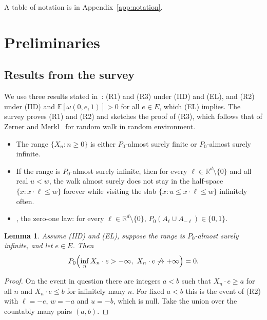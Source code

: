 \documentclass[11pt]{amsart}
\newtheorem{lemma}[theorem]{Lemma}
\theoremstyle{remark}
\newcommand{\R}{\mathbb{R}}
\newcommand{\E}{\mathbb{E}}
\begin{document}
A table of notation is in Appendix~\ref{app:notation}.

\section{Preliminaries}\label{sec:prelim}

\subsection{Results from the survey}
We use three results stated in~\cite{KZ13}: (R1) and (R3) under (IID) and (EL), and (R2) under (IID) and
$\E[\omega(0,e,1)]>0$ for all $e\in E$, which (EL) implies. The survey proves (R1) and (R2) and sketches the proof of
(R3), which follows that of Zerner and Merkl~\cite[Proposition 3]{ZM01} for random walk in random environment.

\begin{itemize}
\item[(R1)] \cite[Theorem 2.5]{KZ13} The range $\{X_n:n\ge0\}$ is either $P_0$-almost surely finite or
$P_0$-almost surely infinite.
\item[(R2)] \cite[Lemma 3.18]{KZ13} If the range is $P_0$-almost surely infinite, then for every
$\ell\in\R^d\setminus\{0\}$ and all real $u<w$, the walk almost surely does not stay in the half-space
$\{x:x\cdot\ell\le w\}$ forever while visiting the slab $\{x:u\le x\cdot\ell\le w\}$ infinitely often.
\item[(R3)] \cite[Theorem 3.16]{KZ13}, the zero-one law: for every $\ell\in\R^d\setminus\{0\}$, $P_0(A_\ell\cup A_{-\ell})\in\{0,1\}$.
\end{itemize}

\begin{lemma}\label{lem:onesidedpaths}
Assume (IID) and (EL), suppose the range is $P_0$-almost surely infinite, and let $e\in E$. Then
\[
P_0\Bigl(\inf_n X_n\cdot e>-\infty,\ X_n\cdot e\not\to+\infty\Bigr)=0 .
\]
\end{lemma}

\begin{proof}
On the event in question there are integers $a<b$ such that $X_n\cdot e\ge a$ for all $n$ and $X_n\cdot e\le b$ for
infinitely many $n$. For fixed $a<b$ this is the event of (R2) with $\ell=-e$, $w=-a$ and $u=-b$, which is null. Take the
union over the countably many pairs $(a,b)$.
\end{proof}
\end{document}
